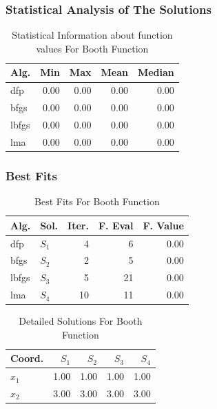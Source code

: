 \documentclass[conference]{IEEEtran}
\begin{document}
\subsubsection{Statistical Analysis of The Solutions}
\label{statisticalanalysisbooth2D}

\begin{table}[H]
\centering
\caption{Statistical Information about function values For Booth Function}
\label{function_values:booth}
\begin{tabular}{lrrrr}
\toprule
 Alg. &  Min &  Max &  Mean &  Median \\
\midrule
  dfp & 0.00 & 0.00 &  0.00 &    0.00 \\
 bfgs & 0.00 & 0.00 &  0.00 &    0.00 \\
lbfgs & 0.00 & 0.00 &  0.00 &    0.00 \\
  lma & 0.00 & 0.00 &  0.00 &    0.00 \\
\bottomrule
\end{tabular}
\end{table}

\subsubsection{Best Fits}
\label{bestfitsbooth2D}

\begin{table}[H]
\centering
\caption{Best Fits For Booth Function}
\label{solutions:booth}
\begin{tabular}{llrrr}
\toprule
 Alg. &    Sol. &  Iter. &  F. Eval &  F. Value \\
\midrule
  dfp & $S_{1}$ &      4 &        6 &      0.00 \\
 bfgs & $S_{2}$ &      2 &        5 &      0.00 \\
lbfgs & $S_{3}$ &      5 &       21 &      0.00 \\
  lma & $S_{4}$ &     10 &       11 &      0.00 \\
\bottomrule
\end{tabular}
\end{table}

\begin{table}[H]
\centering
\caption{Detailed Solutions For Booth Function}
\label{detailedsolutions:booth}
\begin{tabular}{lrrrr}
\toprule
 Coord. &  $S_{1}$ &  $S_{2}$ &  $S_{3}$ &  $S_{4}$ \\
\midrule
$x_{1}$ &     1.00 &     1.00 &     1.00 &     1.00 \\
$x_{2}$ &     3.00 &     3.00 &     3.00 &     3.00 \\
\bottomrule
\end{tabular}
\end{table}
\end{document}
